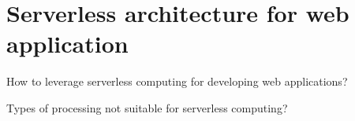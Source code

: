 \chapter{Serverless architecture for web application}

How to leverage serverless computing for developing web applications?

Types of processing not suitable for serverless computing?


